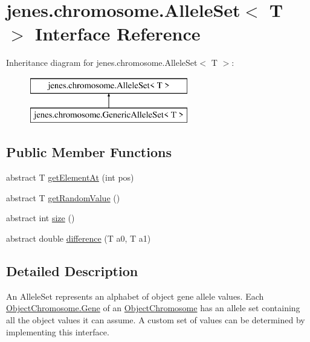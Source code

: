 \hypertarget{interfacejenes_1_1chromosome_1_1_allele_set_3_01_t_01_4}{\section{jenes.\-chromosome.\-Allele\-Set$<$ T $>$ Interface Reference}
\label{interfacejenes_1_1chromosome_1_1_allele_set_3_01_t_01_4}
}
Inheritance diagram for jenes.\-chromosome.\-Allele\-Set$<$ T $>$\-:\begin{figure}[H]
\begin{center}
\leavevmode
\includegraphics[height=2.000000cm]{interfacejenes_1_1chromosome_1_1_allele_set_3_01_t_01_4}
\end{center}
\end{figure}
\subsection*{Public Member Functions}
\begin{DoxyCompactItemize}
\item 
abstract T \hyperlink{interfacejenes_1_1chromosome_1_1_allele_set_3_01_t_01_4_a10625403643dc57a5c655a92a49aa644}{get\-Element\-At} (int pos)
\item 
abstract T \hyperlink{interfacejenes_1_1chromosome_1_1_allele_set_3_01_t_01_4_ac09d409c55d941892df658d21b3d4bff}{get\-Random\-Value} ()
\item 
abstract int \hyperlink{interfacejenes_1_1chromosome_1_1_allele_set_3_01_t_01_4_a3acbb10df92ebafc589d5d8546949f2f}{size} ()
\item 
abstract double \hyperlink{interfacejenes_1_1chromosome_1_1_allele_set_3_01_t_01_4_a74ab0cb120fcfdee8e878727d6c50815}{difference} (T a0, T a1)
\end{DoxyCompactItemize}


\subsection{Detailed Description}
An Allele\-Set represents an alphabet of object gene allele values. Each \hyperlink{classjenes_1_1chromosome_1_1_object_chromosome_1_1_gene}{Object\-Chromosome.\-Gene} of an \hyperlink{classjenes_1_1chromosome_1_1_object_chromosome}{Object\-Chromosome} has an allele set containing all the object values it can assume. A custom set of values can be determined by implementing this interface.


